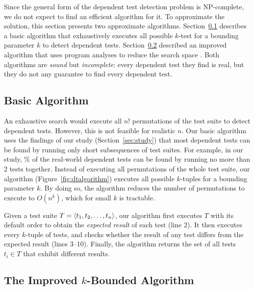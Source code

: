 Since the general form of the dependent test detection problem is
NP-complete, we do not expect to find an efficient algorithm for it.
To approximate the solution, this section
presents two approximate algorithms.
Section~\ref{sec:basic} describes a basic algorithm that
exhaustively executes all possible $k$-test for a bounding parameter $k$
to detect dependent tests.
Section~\ref{sec:advalgorithm} described an improved algorithm
that uses program analyses to reduce the search space
.
Both algorithms are \textit{sound} but \textit{incomplete}:
every dependent test they find is real, but they do not
any guarantee to find every dependent test.


\subsection{Basic Algorithm}
\label{sec:basic}

An exhaustive search would execute all $n!$
permutations of the test suite to detect dependent tests.
However, this is not feasible for realistic $n$.
Our basic algorithm uses the findings of our study
(Section~\ref{sec:study})
that most dependent tests can be found by running only short
subsequences of test suites. For example,
in our study, \todo{}\% of the real-world dependent tests
can be found by running no more than 2 tests together.
Instead of executing all permutations of the
whole test suite, our algorithm (Figure~\ref{fig:dtalgorithm})
executes all possible $k$-tuples for a bounding
parameter $k$.
By doing so, the algorithm reduces
the number of permutations to execute
to $O(n^k)$, which for small $k$ is tractable. 


Given a test suite $T =  \langle t_1, t_2, \ldots, t_n \rangle $, our algorithm
first executes $T$ with its default order
to obtain the \emph{expected result} of each test (line 2). 
It then executes every $k$-tuple of tests,
and checks whether the result of any test differs
from the expected result (lines 3--10). Finally, the algorithm returns the set
of all tests $t_i \in T$
that exhibit different results.





\subsection{The Improved $k$-Bounded Algorithm}
\label{sec:advalgorithm}

